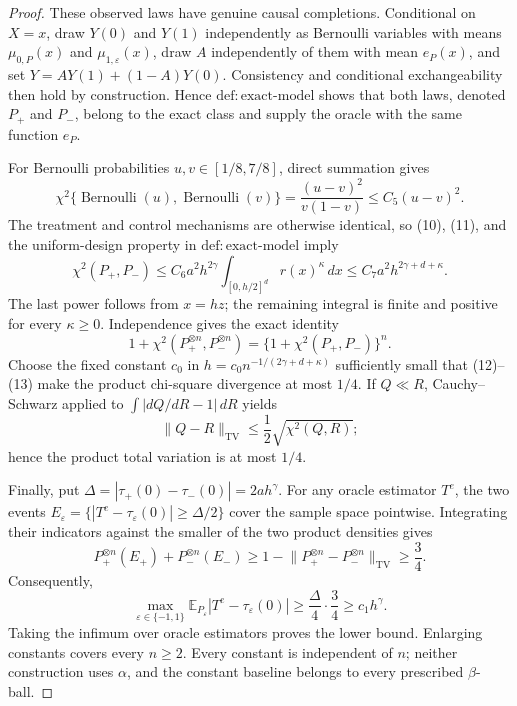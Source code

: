 \documentclass{article}
\begin{document}
\begin{proof}
These observed laws have genuine causal completions.  Conditional on \(X=x\), draw \(Y(0)\) and \(Y(1)\) independently as Bernoulli variables with means \(\mu_{0,P}(x)\) and \(\mu_{1,\varepsilon}(x)\), draw \(A\) independently of them with mean \(e_P(x)\), and set \(Y=AY(1)+(1-A)Y(0)\).  Consistency and conditional exchangeability then hold by construction.  Hence \(\mathrm{def:exact\mbox{-}model}\) shows that both laws, denoted \(P_+\) and \(P_-\), belong to the exact class and supply the oracle with the same function \(e_P\).

For Bernoulli probabilities \(u,v\in[1/8,7/8]\), direct summation gives
\[
 \chi^2\{\operatorname{Bernoulli}(u),\operatorname{Bernoulli}(v)\}
 =\frac{(u-v)^2}{v(1-v)}\leq C_5(u-v)^2.
 \tag{11}
\]
The treatment and control mechanisms are otherwise identical, so (10), (11), and the uniform-design property in \(\mathrm{def:exact\mbox{-}model}\) imply
\[
 \chi^2(P_+,P_-)
 \leq C_6a^2h^{2\gamma}\int_{[0,h/2]^d}r(x)^\kappa\,dx
 \leq C_7a^2h^{2\gamma+d+\kappa}.
 \tag{12}
\]
The last power follows from \(x=hz\); the remaining integral is finite and positive for every \(\kappa\geq0\).  Independence gives the exact identity
\[
 1+\chi^2(P_+^{\otimes n},P_-^{\otimes n})
 =\{1+\chi^2(P_+,P_-)\}^n.
 \tag{13}
\]
Choose the fixed constant \(c_0\) in \(h=c_0n^{-1/(2\gamma+d+\kappa)}\) sufficiently small that (12)--(13) make the product chi-square divergence at most \(1/4\).  If \(Q\ll R\), Cauchy--Schwarz applied to \(\int|dQ/dR-1|\,dR\) yields
\[
 \lVert Q-R\rVert_{\mathrm{TV}}\leq\frac12\sqrt{\chi^2(Q,R)};
\]
hence the product total variation is at most \(1/4\).

Finally, put \(\Delta=|\tau_+(0)-\tau_-(0)|=2ah^\gamma\).  For any oracle estimator \(T^e\), the two events \(E_\varepsilon=\{|T^e-\tau_\varepsilon(0)|\geq\Delta/2\}\) cover the sample space pointwise.  Integrating their indicators against the smaller of the two product densities gives
\[
 P_+^{\otimes n}(E_+)+P_-^{\otimes n}(E_-)
 \geq1-\lVert P_+^{\otimes n}-P_-^{\otimes n}\rVert_{\mathrm{TV}}
 \geq\frac34.
\]
Consequently,
\[
 \max_{\varepsilon\in\{-1,1\}}
 \mathbb E_{P_\varepsilon}|T^e-\tau_\varepsilon(0)|
 \geq\frac{\Delta}{4}\cdot\frac34
 \geq c_1h^\gamma.
\]
Taking the infimum over oracle estimators proves the lower bound.  Enlarging constants covers every \(n\geq2\).  Every constant is independent of \(n\); neither construction uses \(\alpha\), and the constant baseline belongs to every prescribed \(\beta\)-ball.
\end{proof}
\end{document}
